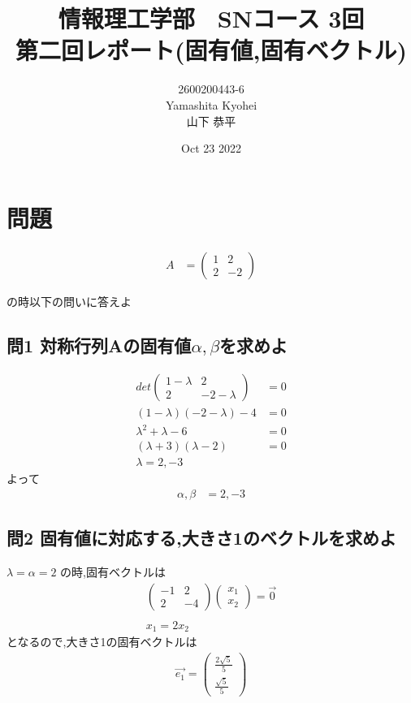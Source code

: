 \documentclass[dvipdfmx,autodetect-engine,titlepage]{jsarticle}
\title{情報理工学部　SNコース 3回\\
第二回レポート(固有値,固有ベクトル)\\}
\author{2600200443-6\\Yamashita Kyohei\\山下 恭平}
\date{Oct 23 2022}
\begin{document}
\maketitle

\section*{問題}

\begin{align*}
  A
    &=
  \begin{pmatrix}
    1 & 2 \\
    2 & -2 
  \end{pmatrix}
\end{align*}

の時以下の問いに答えよ

\subsection*{問1 対称行列Aの固有値\begin{math}\alpha,\beta \end{math}を求めよ}

\begin{align*}
 det
  \begin{pmatrix}
    1-\lambda & 2 \\
    2 & -2-\lambda 
  \end{pmatrix}
  &= 0 \\
  (1-\lambda)(-2-\lambda)-4 &= 0\\
  \lambda^2 + \lambda -6 &= 0 \\
  (\lambda+3)(\lambda-2) &= 0\\
  \lambda = 2,-3
\end{align*}
よって
\begin{align*}
  \alpha,\beta &= 2 , -3
 \end{align*}

\subsection*{問2 固有値に対応する,大きさ1のベクトルを求めよ}

\begin{math}
  \lambda = \alpha = 2
\end{math} 
の時,固有ベクトルは
\begin{align*}
  \begin{pmatrix}
    -1 & 2 \\
    2 & -4
  \end{pmatrix}
  \begin{pmatrix}
    x_1 \\
    x_2
  \end{pmatrix}
  =
  \overrightarrow{0}\\\\
  x_1 = 2x_2
\end{align*}
となるので,大きさ1の固有ベクトルは
\begin{align}
  \overrightarrow{e_1} =   \begin{pmatrix}
    \frac{2\sqrt{5} }{5} \\
    \frac{\sqrt{5}}{5}
  \end{pmatrix}
\end{align}
\end{document}
